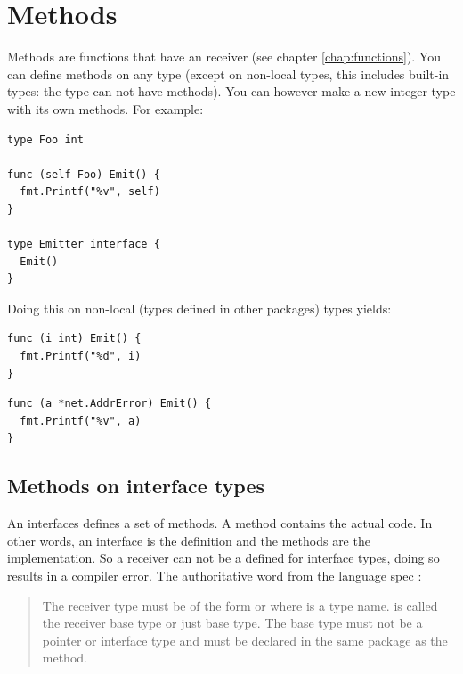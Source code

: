\section{Methods}
Methods are functions that have an receiver (see chapter
\ref{chap:functions}).
You can define methods on any type (except on non-local types, this includes
built-in types: the type  can not have methods).
You can however make a new integer type with its own methods. For example:
\begin{lstlisting}
type Foo int

func (self Foo) Emit() {
  fmt.Printf("%v", self)
}

type Emitter interface {
  Emit()
}
\end{lstlisting}
Doing this on non-local (types defined in other packages) types yields:

\begin{minipage}{.5\textwidth}
\begin{lstlisting}[linewidth=.7\textwidth,caption=Failure extending built-in types]
func (i int) Emit() {
  fmt.Printf("%d", i)
}
\end{lstlisting}
\noindent{}
\end{minipage}
\begin{minipage}{.5\textwidth}
\begin{lstlisting}[caption=Failure extending non-local types]
func (a *net.AddrError) Emit() {
  fmt.Printf("%v", a)
}
\end{lstlisting}
\noindent{}
\end{minipage}

\paragraph{}  %

\subsection{Methods on interface types}
An interfaces defines a set of methods. A method contains the actual code.
In other words, an interface is the definition and the methods are the implementation.
So a receiver can not be a defined for interface
types, doing so results in a  compiler
error. The authoritative word from the language spec \cite{go_spec}:
\begin{quote}
The receiver type must be of the form  or  where
 is a type name.  is called the receiver base type or just base 
type. The base type must
not be a pointer or interface type and must be declared in the same
package as the method.
\end{quote}


